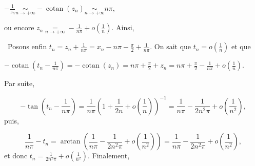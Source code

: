 \documentclass[11pt,a4paper]{article}
\newcommand{\cotan}{\mathop{\mathrm{cotan}}\nolimits}
\newcommand{\Arctan}{\mathop{\mathrm{arctan}}\nolimits}
\begin{document}
\begin{center}
$-\frac{1}{z_n}\underset{n\rightarrow+\infty}{\sim}-\cotan(z_n)\underset{n\rightarrow+\infty}{\sim}n\pi$,
\end{center}
ou encore $z_n\underset{n\rightarrow+\infty}{=}-\frac{1}{n\pi}+o\left(\frac{1}{n}\right)$. Ainsi,

\begin{center}
\end{center}
\textbullet~Posons enfin $t_n=z_n+\frac{1}{n\pi}=x_n-n\pi-\frac{\pi}{2}+\frac{1}{n\pi}$. On sait que $t_n=o\left(\frac{1}{n}\right)$ et que 

\begin{center}
$-\cotan\left(t_n-\frac{1}{n\pi}\right)=-\cotan(z_n)=n\pi+\frac{\pi}{2}+z_n=n\pi+\frac{\pi}{2}-\frac{1}{n\pi}+o(\frac{1}{n})$.
\end{center} Par suite,
 
$$-\tan\left(t_n-\frac{1}{n\pi}\right)=\frac{1}{n\pi}\left(1+\frac{1}{2n}+o(\frac{1}{n})\right)^{-1}=\frac{1}{n\pi}-\frac{1}{2n^2\pi}+o\left(\frac{1}{n^2}\right),$$
puis,

$$\frac{1}{n\pi}-t_n=\Arctan\left(\frac{1}{n\pi}-\frac{1}{2n^2\pi}+o(\frac{1}{n^2})\right)=\frac{1}{n\pi}-\frac{1}{2n^2\pi}+o\left(\frac{1}{n^2}\right),$$ 
et donc $t_n=\frac{1}{2n^2\pi}+o\left(\frac{1}{n^2}\right)$. Finalement, 

\begin{center}
\end{center}
\end{document}
